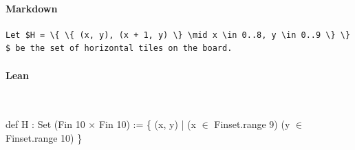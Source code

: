 \paragraph{Markdown}
{\small\begin{verbatim}
Let $H = \{ \{ (x, y), (x + 1, y) \} \mid x \in 0..8, y \in 0..9 \} \}
$ be the set of horizontal tiles on the board.
\end{verbatim}}

\paragraph{Lean} \
\begin{leancode}
    def H : Set (Fin 10 $\times$ Fin 10) := \{ (x, y) | (x $\in$ Finset.range 9) (y $\in$ Finset.range 10) \}
\end{leancode}

\vspace{-0.5cm}
